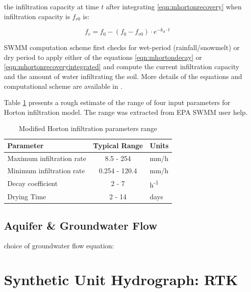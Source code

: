 the infiltration capacity at time $t$ after integrating \ref{eqn:mhortonrecovery} when infiltration capacity is $f_{r0}$ is:

\begin{equation}
\label{eqn:mhortonrecoveryintegrated}
f_r =  f_0 - (f_0 - f_{r0}) \cdot e^{-k_d \cdot t}
\end{equation}
    
SWMM computation scheme first checks for wet-period (rainfall/snowmelt) or dry period to apply either of the equations \ref{eqn:mhortondecay} or \ref{eqn:mhortonrecoveryintegrated}  and compute the current infiltration capacity and the amount of water infiltrating the soil. More details of the equations and computational scheme are available in \citet{Rossman2016}.

Table \ref{tbl:infparam} presents a rough estimate of the range of four input parameters for Horton infiltration model. The range was extracted from EPA SWMM user help. 
 

\begin{table}[h]
\caption{Modified Horton infiltration parameters range\cite{Rossman2016}}
\label{tbl:infparam}
\centering
\begin{tabular}{@{}lcll@{}}
\toprule
\textbf{Parameter}        & \multicolumn{2}{c}{\textbf{Typical Range}} & \textbf{Units}        \\ \midrule
Maximum infiltration rate & \multicolumn{2}{c}{8.5 - 254}              & mm/h                  \\
Minimum infiltration rate & \multicolumn{2}{c}{0.254 - 120.4}          & mm/h                  \\
Decay coefficient         & \multicolumn{2}{c}{2 - 7}                  & h\textsuperscript{-1}\\
Drying Time               & \multicolumn{2}{c}{2 - 14}                 & days                  \\ \bottomrule
\end{tabular}
\end{table}



\subsection{Aquifer \& Groundwater Flow} \label{groundwater}
 
choice of groundwater flow equation:


\section{Synthetic Unit Hydrograph: RTK}





